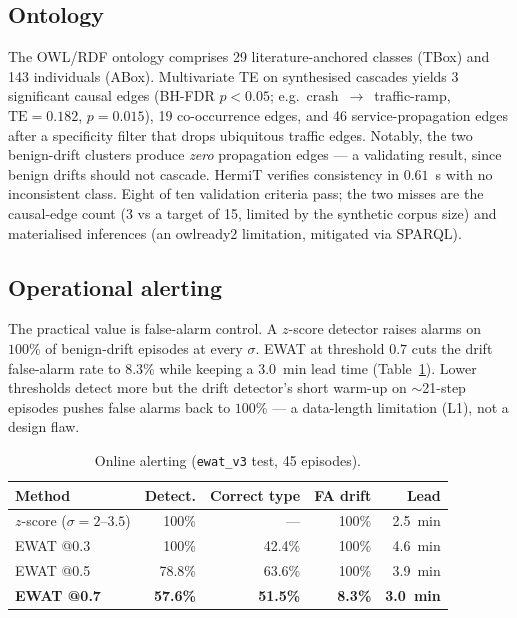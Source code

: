 \subsection{Ontology}
The OWL/RDF ontology comprises 29 literature-anchored classes (TBox) and 143 individuals (ABox).
Multivariate TE on synthesised cascades yields 3 significant causal edges (BH-FDR $p<0.05$;
e.g.\ crash~$\to$~traffic-ramp, $\text{TE}=0.182$, $p=0.015$), 19 co-occurrence edges, and 46
service-propagation edges after a specificity filter that drops ubiquitous traffic edges. Notably,
the two benign-drift clusters produce \emph{zero} propagation edges --- a validating result, since
benign drifts should not cascade. HermiT verifies consistency in $0.61$~s with no inconsistent
class. Eight of ten validation criteria pass; the two misses are the causal-edge count (3 vs a
target of 15, limited by the synthetic corpus size) and materialised inferences (an owlready2
limitation, mitigated via SPARQL).

\subsection{Operational alerting}
The practical value is false-alarm control. A $z$-score detector raises alarms on $100\%$ of
benign-drift episodes at every $\sigma$. EWAT at threshold $0.7$ cuts the drift false-alarm rate to
$8.3\%$ while keeping a $3.0$~min lead time (Table~\ref{tab:alerting}). Lower thresholds detect more
but the drift detector's short warm-up on $\sim$21-step episodes pushes false alarms back to
$100\%$ --- a data-length limitation (L1), not a design flaw.

\begin{table}[t]
\centering
\caption{Online alerting (\texttt{ewat\_v3} test, 45 episodes).}
\label{tab:alerting}
\small
\begin{tabularx}{\columnwidth}{@{}Xrrrr@{}}
\toprule
\textbf{Method} & \textbf{Detect.} & \textbf{Correct type} & \textbf{FA drift} & \textbf{Lead} \\
\midrule
$z$-score ($\sigma{=}2$--$3.5$) & 100\% & --- & 100\% & 2.5~min \\
EWAT @0.3 & 100\% & 42.4\% & 100\% & 4.6~min \\
EWAT @0.5 & 78.8\% & 63.6\% & 100\% & 3.9~min \\
\textbf{EWAT @0.7} & \textbf{57.6\%} & \textbf{51.5\%} & \textbf{8.3\%} & \textbf{3.0~min} \\
\bottomrule
\end{tabularx}
\end{table}
